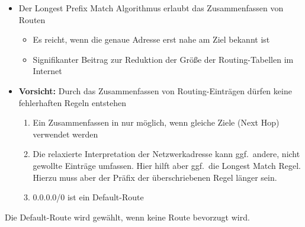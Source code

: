 \begin{itemize}
    \item Der Longest Prefix Match Algorithmus erlaubt das Zusammenfassen von Routen
    \begin{itemize}
        \item Es reicht, wenn die genaue Adresse erst nahe am Ziel bekannt ist
        \item Signifikanter Beitrag zur Reduktion der Größe der Routing-Tabellen im Internet
    \end{itemize}
    \item \textbf{Vorsicht:} Durch das Zusammenfassen von Routing-Einträgen dürfen keine fehlerhaften Regeln entstehen
    \begin{enumerate}
        \item Ein Zusammenfassen in nur möglich, wenn gleiche Ziele (Next Hop) verwendet werden
        \item Die relaxierte Interpretation der Netzwerkadresse kann ggf.\ andere, nicht gewollte Einträge umfassen.
        Hier hilft aber ggf.\ die Longest Match Regel.
        Hierzu muss aber der Präfix der überschriebenen Regel länger sein.
        \item 0.0.0.0/0 ist ein Default-Route
    \end{enumerate}
\end{itemize}

Die Default-Route wird gewählt, wenn keine Route bevorzugt wird.
    